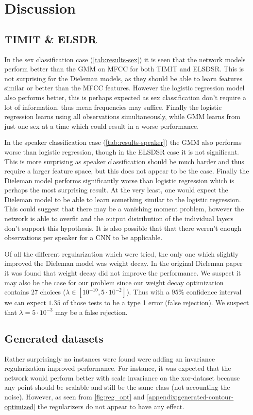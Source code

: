 \section{Discussion}
\subsection{TIMIT \& ELSDR}
In the sex classification case (\cref{tab:results-sex}) it is seen that the network models perform better than the GMM on MFCC for both TIMIT and ELSDSR. This is not surprising for the Dieleman models, as they should be able to learn features similar or better than the MFCC features. However the logistic regression model also performs better, this is perhaps expected as sex classification don't require a lot of information, thus mean frequencies may suffice. Finally the logistic regression learns using all observations simultaneously, while GMM learns from just one sex at a time which could result in a worse performance.

In the speaker classification case (\cref{tab:results-speaker}) the GMM also performs worse than logistic regression, though in the ELSDSR case it is not significant. This is more surprising as speaker classification should be much harder and thus require a larger feature space, but this does not appear to be the case. Finally the Dieleman model performs significantly worse than logistic regression which is perhaps the most surprising result. At the very least, one would expect the Dieleman model to be able to learn something similar to the logistic regression. This could suggest that there may be a vanishing moment problem, however the network is able to overfit and the output distribution of the individual layers don't support this hypothesis. It is also possible that that there weren't enough observations per speaker for a CNN to be applicable.

Of all the different regularization which were tried, the only one which slightly improved the Dieleman model was weight decay. In the original Dieleman paper \cite{dieleman} it was found that weight decay did not improve the performance. We suspect it may also be the case for our problem since our weight decay optimization contains 27 choices ($\lambda \in [10^{-10}, 5 \cdot 10^{-2}]$). Thus with a $95\%$ confidence interval we can expect $1.35$ of those tests to be a type 1 error (false rejection). We suspect that $\lambda = 5 \cdot 10^{-3}$ may be a false rejection.

\subsection{Generated datasets}
Rather surprisingly no instances were found were adding an invariance regularization improved performance. For instance, it was expected that the network would perform better with scale invariance on the xor-dataset because any point should be scalable and still be the same class (not accounting the noise). However, as seen from \cref{fig:reg_opt} and \cref{appendix:generated-contour-optimized} the regularizers do not appear to have any effect. 

